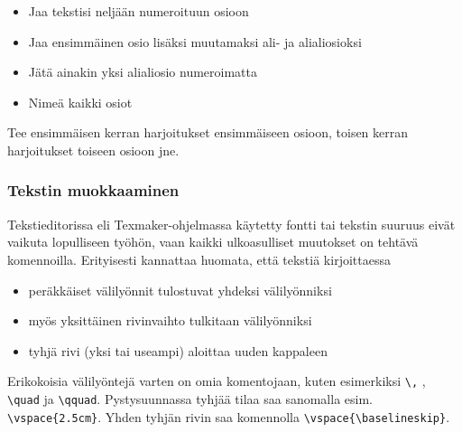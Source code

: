 \begin{fframe}
    \begin{harj}
        \begin{itemize}
            \item Jaa tekstisi neljään numeroituun osioon
            \item Jaa ensimmäinen osio lisäksi muutamaksi ali- ja alialiosioksi
            \item Jätä ainakin yksi alialiosio numeroimatta
            \item Nimeä kaikki osiot
        \end{itemize}
        Tee ensimmäisen kerran harjoitukset ensimmäiseen osioon, toisen kerran harjoitukset toiseen osioon jne. 
    \end{harj}
\end{fframe}

\begin{fframe}
    \frametitle{Tekstin muokkaaminen}
    Tekstieditorissa eli Texmaker-ohjelmassa käytetty fontti tai tekstin suuruus eivät vaikuta lopulliseen työhön, vaan kaikki ulkoasulliset muutokset on tehtävä komennoilla.%
    \vaihto\pause
    Erityisesti kannattaa huomata, että tekstiä kirjoittaessa
    \begin{itemize}[<+->]
        \item peräkkäiset välilyönnit tulostuvat yhdeksi välilyönniksi
        \item myös yksittäinen rivinvaihto tulkitaan välilyönniksi
        \item tyhjä rivi (yksi tai useampi) aloittaa uuden kappaleen
    \end{itemize}
    \pause
    Erikokoisia välilyöntejä varten on omia komentojaan, kuten esimerkiksi \lstinline-\,- , \lstinline-\quad- ja \lstinline-\qquad-.
    \vaihto\pause Pystysuunnassa tyhjää tilaa saa sanomalla esim. \lstinline-\vspace{2.5cm}-. Yhden tyhjän rivin saa komennolla \lstinline-\vspace{\baselineskip}-.
\end{fframe}

%

